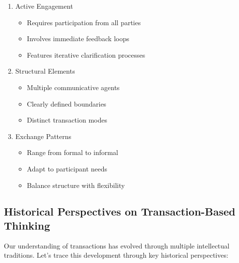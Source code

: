 \documentclass[12pt]{article}
\begin{document}
\begin{enumerate}
\item Active Engagement
\begin{itemize}
\item Requires participation from all parties
\item Involves immediate feedback loops
\item Features iterative clarification processes
\end{itemize}

\item Structural Elements
\begin{itemize}
\item Multiple communicative agents
\item Clearly defined boundaries
\item Distinct transaction modes
\end{itemize}

\item Exchange Patterns
\begin{itemize}
\item Range from formal to informal
\item Adapt to participant needs
\item Balance structure with flexibility
\end{itemize}
\end{enumerate}

\subsection{Historical Perspectives on Transaction-Based Thinking}

Our understanding of transactions has evolved through multiple intellectual traditions. Let's trace this development through key historical perspectives:
\end{document}
